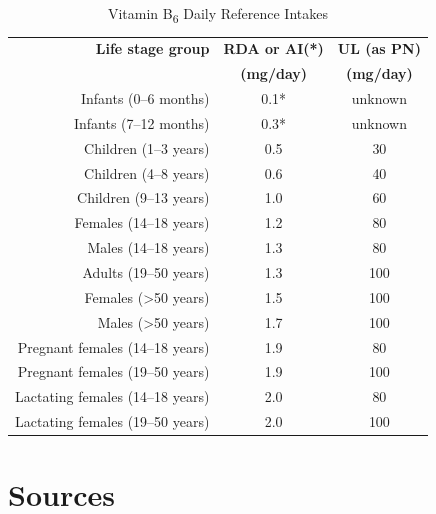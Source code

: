 \documentclass{book}
\begin{document}
\begin{sloppypar}
\begin{table}[ht]
	\caption{Vitamin B\textsubscript{6} Daily Reference Intakes}
	\centering \begin{tabular}{| r | c | c |}
		\hline
		\textbf{Life stage group}			& \textbf{RDA or AI(*)}	& \textbf{UL (as PN)}	\\
											& \textbf{(mg/day)}		& \textbf{(mg/day)}		\\ \hline
		Infants (0--6 months)				& 0.1*					& unknown				\\ \hline
		Infants (7--12 months)				& 0.3*					& unknown				\\ \hline
		Children (1--3 years)				& 0.5					& 30					\\ \hline
		Children (4--8 years)				& 0.6					& 40					\\ \hline
		Children (9--13 years)				& 1.0					& 60					\\ \hline
		Females (14--18 years)				& 1.2					& 80					\\ \hline
		Males (14--18 years)				& 1.3					& 80					\\ \hline
		Adults (19--50 years)				& 1.3					& 100					\\ \hline
		Females (\textgreater50 years)		& 1.5					& 100					\\ \hline
		Males (\textgreater50 years)		& 1.7					& 100					\\ \hline
		Pregnant females (14--18 years)		& 1.9					& 80					\\ \hline
		Pregnant females (19--50 years)		& 1.9					& 100					\\ \hline
		Lactating females (14--18 years)	& 2.0					& 80					\\ \hline
		Lactating females (19--50 years)	& 2.0					& 100					\\ \hline
	\end{tabular}
\end{table}
\newpage

\section{Sources}



\end{sloppypar}
\end{document}
